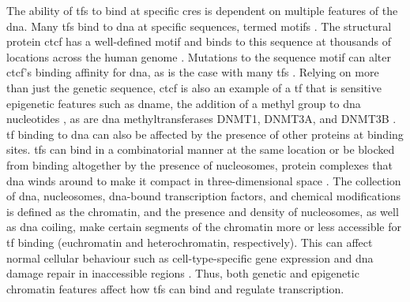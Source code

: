 The ability of \glspl{tf} to bind at specific \glspl{cre} is dependent on multiple features of the \gls{dna}.
Many \glspl{tf} bind to \gls{dna} at specific sequences, termed motifs \cite{farnhamInsightsGenomicProfiling2009,spitzTranscriptionFactorsEnhancer2012}.
The structural protein \gls{ctcf} has a well-defined motif and binds to this sequence at thousands of locations across the human genome \cite{kimAnalysisVertebrateInsulator2007,dixonTopologicalDomainsMammalian2012}.
Mutations to the sequence motif can alter \gls{ctcf}'s binding affinity for \gls{dna}, as is the case with many \glspl{tf} \cite{kasowskiVariationTranscriptionFactor2010,mauranoWidespreadSitedependentBuffering2012,mauranoLargescaleIdentificationSequence2015}.
Relying on more than just the genetic sequence, \Gls{ctcf} is also an example of a \gls{tf} that is sensitive epigenetic features such as \gls{dname}, the addition of a methyl group to \gls{dna} nucleotides \cite{mauranoRoleDNAMethylation2015,wangWidespreadPlasticityCTCF2012,wiehleDNAMethylationEmbryonic2019,xuNascentDNAMethylome2018,vinerModelingMethylsensitiveTranscription2016}, as are \gls{dna} methyltransferases DNMT1, DNMT3A, and DNMT3B \cite{gollEukaryoticCytosineMethyltransferases2005,listerHumanDNAMethylomes2009}.
\Gls{tf} binding to \gls{dna} can also be affected by the presence of other proteins at binding sites.
\Glspl{tf} can bind in a combinatorial manner at the same location \cite{farnhamInsightsGenomicProfiling2009,ongEnhancerFunctionNew2011,spitzTranscriptionFactorsEnhancer2012} or be blocked from binding altogether by the presence of nucleosomes, protein complexes that \gls{dna} winds around to make it compact in three-dimensional space \cite{henikoffNucleosomeDestabilizationEpigenetic2008,jiangNucleosomePositioningGene2009}.
The collection of \gls{dna}, nucleosomes, \gls{dna}-bound transcription factors, and chemical modifications is defined as the chromatin, and the presence and density of nucleosomes, as well as \gls{dna} coiling, make certain segments of the chromatin more or less accessible for \gls{tf} binding (euchromatin and heterochromatin, respectively).
This can affect normal cellular behaviour such as cell-type-specific gene expression \cite{vierstraGlobalReferenceMapping2020,cusanovichSingleCellAtlasVivo2018} and \gls{dna} damage repair in inaccessible regions \cite{polakCelloforiginChromatinOrganization2015}.
Thus, both genetic and epigenetic chromatin features affect how \glspl{tf} can bind and regulate transcription.

